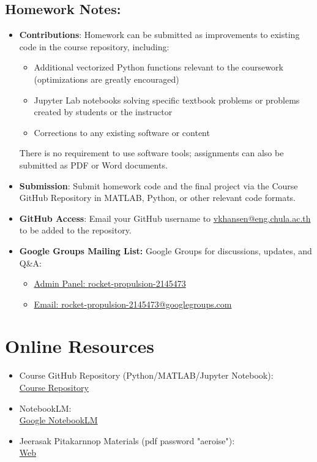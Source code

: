\documentclass[12pt]{article}
\begin{document}
\subsection*{Homework Notes:}
\begin{itemize}
    \item \textbf{Contributions}: Homework can be submitted as improvements to existing code in the course repository, including:
    \begin{itemize}
        \item Additional vectorized Python functions relevant to the coursework (optimizations are greatly encouraged)
        \item Jupyter Lab notebooks solving specific textbook problems or problems created by students or the instructor
        \item Corrections to any existing software or content
    \end{itemize}
    There is no requirement to use software tools; assignments can also be submitted as PDF or Word documents.
    \item \textbf{Submission}: Submit homework code and the final project via the Course GitHub Repository in MATLAB, Python, or other relevant code formats.
    \item \textbf{GitHub Access}: Email your GitHub username to \href{mailto:vkhansen@eng.chula.ac.th}{vkhansen@eng.chula.ac.th} to be added to the repository.

    \item \textbf{Google Groups Mailing List:} Google Groups for discussions, updates, and Q\&A:
        \begin{itemize}
            \item \href{https://groups.google.com/g/rocket-propulsion-2145473}{Admin Panel: rocket-propulsion-2145473}
            \item \href{mailto:rocket-propulsion-2145473@googlegroups.com}{Email: rocket-propulsion-2145473@googlegroups.com}
        \end{itemize}

    
\end{itemize}

\section*{Online Resources}
\begin{itemize}
    \item Course GitHub Repository (Python/MATLAB/Jupyter Notebook):\\
    \href{https://github.com/vkhansen/rocket_propulsion.git}{Course Repository}
    \item NotebookLM:\\
    \href{https://notebooklm.google.com/notebook/c7f10837-5c21-46ee-af09-273d38bb41a3}{Google NotebookLM}
    \item Jeerasak Pitakarnnop Materials (pdf password "aeroise"):\\
    \href{https://pitakarnnop.wordpress.com/engineering-courses/rocket-propulsion}{Web}
\end{itemize}
\end{document}
